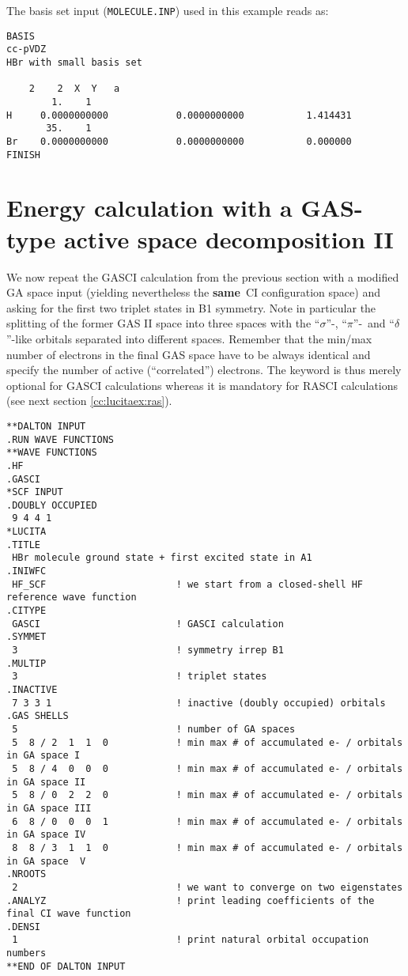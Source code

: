 The basis set input (\verb|MOLECULE.INP|) used in this example reads as:

\begin{verbatim}
BASIS
cc-pVDZ
HBr with small basis set

    2    2  X  Y   a
        1.    1
H     0.0000000000            0.0000000000           1.414431
       35.    1
Br    0.0000000000            0.0000000000           0.000000
FINISH
\end{verbatim}

\section{Energy calculation with a GAS-type active space decomposition II}\label{cc:lucitaex:gas2}

We now repeat the GASCI calculation from the previous section 
with a modified GA space input (yielding nevertheless the {\bf{same}}\ CI configuration space) 
and asking for the first two triplet states in B1 symmetry. 
Note in particular the splitting of the former GAS II space into three 
spaces with the ``$\sigma$''-, ``$\pi$''-\ and ``$\delta$''-like orbitals separated into different spaces. 
Remember that the min/max number of electrons in the final GAS space have to be always identical and 
specify the number of active (``correlated'') electrons. The keyword  is thus merely optional for 
GASCI calculations whereas it is mandatory for RASCI calculations (see next section \ref{cc:lucitaex:ras}). 

%
\begin{verbatim}
**DALTON INPUT
.RUN WAVE FUNCTIONS
**WAVE FUNCTIONS
.HF
.GASCI
*SCF INPUT
.DOUBLY OCCUPIED
 9 4 4 1
*LUCITA
.TITLE
 HBr molecule ground state + first excited state in A1
.INIWFC
 HF_SCF                       ! we start from a closed-shell HF reference wave function
.CITYPE
 GASCI                        ! GASCI calculation
.SYMMET
 3                            ! symmetry irrep B1
.MULTIP
 3                            ! triplet states
.INACTIVE
 7 3 3 1                      ! inactive (doubly occupied) orbitals
.GAS SHELLS
 5                            ! number of GA spaces
 5  8 / 2  1  1  0            ! min max # of accumulated e- / orbitals in GA space I
 5  8 / 4  0  0  0            ! min max # of accumulated e- / orbitals in GA space II
 5  8 / 0  2  2  0            ! min max # of accumulated e- / orbitals in GA space III
 6  8 / 0  0  0  1            ! min max # of accumulated e- / orbitals in GA space IV
 8  8 / 3  1  1  0            ! min max # of accumulated e- / orbitals in GA space  V
.NROOTS
 2                            ! we want to converge on two eigenstates
.ANALYZ                       ! print leading coefficients of the final CI wave function
.DENSI
 1                            ! print natural orbital occupation numbers
**END OF DALTON INPUT
\end{verbatim}

